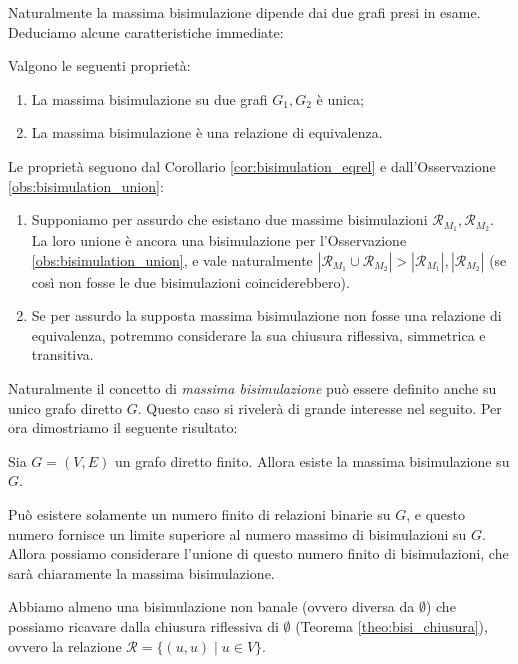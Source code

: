 Naturalmente la massima bisimulazione dipende dai due grafi presi in esame. Deduciamo alcune caratteristiche immediate:
\begin{proposition}
    Valgono le seguenti proprietà:
    \begin{enumerate}
        \item La massima bisimulazione su due grafi $G_1,G_2$ è unica;
        \item La massima bisimulazione è una relazione di equivalenza.
    \end{enumerate}
    \vspace*{-0.3cm}
    \label{prop:bisi_max_equi}
\end{proposition}
\begin{proof2}
    Le proprietà seguono dal Corollario \ref{cor:bisimulation_eqrel} e dall'Osservazione \ref{obs:bisimulation_union}:
    \begin{enumerate}
        \item Supponiamo per assurdo che esistano due massime bisimulazioni $\mathcal{R}_{M_1}, \mathcal{R}_{M_2}$. La loro unione è ancora una bisimulazione per l'Osservazione \ref{obs:bisimulation_union}, e vale naturalmente $|\mathcal{R}_{M_1} \cup \mathcal{R}_{M_2}| > |\mathcal{R}_{M_1}|, |\mathcal{R}_{M_2}|$ (se così non fosse le due bisimulazioni coinciderebbero).
        \item Se per assurdo la supposta massima bisimulazione non fosse una relazione di equivalenza, potremmo considerare la sua chiusura riflessiva, simmetrica e transitiva.
    \end{enumerate}
    \vspace*{-0.7cm}
\end{proof2}

Naturalmente il concetto di \emph{massima bisimulazione} può essere definito anche su unico grafo diretto $G$. Questo caso si rivelerà di grande interesse nel seguito. Per ora dimostriamo il seguente risultato:
\begin{theorem}
    Sia $G=(V,E)$ un grafo diretto finito. Allora esiste la massima bisimulazione su $G$.
\end{theorem}
\begin{proof2}
    Può esistere solamente un numero finito di relazioni binarie su $G$, e questo numero fornisce un limite superiore al numero massimo di bisimulazioni su $G$.
    Allora possiamo considerare l'unione di questo numero finito di bisimulazioni, che sarà chiaramente la massima bisimulazione.

    Abbiamo almeno una bisimulazione non banale (ovvero diversa da $\emptyset$) che possiamo ricavare dalla chiusura riflessiva di $\emptyset$ (Teorema \ref{theo:bisi_chiusura}), ovvero la relazione $\mathcal{R} = \{(u,u) \mid u \in V\}$.
\end{proof2}

